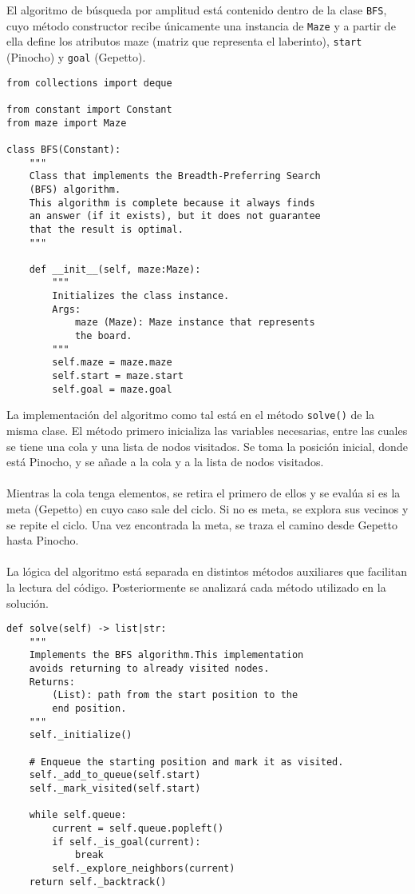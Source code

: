 El algoritmo de búsqueda por amplitud está contenido dentro de la clase \lstinline{BFS}, cuyo método constructor recibe únicamente una instancia de \lstinline{Maze} y a partir de ella define los atributos maze (matriz que representa el laberinto), \lstinline{start} (Pinocho) y \lstinline{goal} (Gepetto).\\
\begin{lstlisting}
from collections import deque

from constant import Constant
from maze import Maze

class BFS(Constant):
    """
    Class that implements the Breadth-Preferring Search
    (BFS) algorithm.
    This algorithm is complete because it always finds
    an answer (if it exists), but it does not guarantee
    that the result is optimal.
    """

    def __init__(self, maze:Maze):
        """
        Initializes the class instance.
        Args:
            maze (Maze): Maze instance that represents
            the board.
        """
        self.maze = maze.maze
        self.start = maze.start
        self.goal = maze.goal
\end{lstlisting}
\clearpage
La implementación del algoritmo como tal está en el método \lstinline{solve()} de la misma clase. El método primero inicializa las variables necesarias, entre las cuales se tiene una cola y una lista de nodos visitados. Se toma la posición inicial, donde está Pinocho, y se añade a la cola y a la lista de nodos visitados.\\\\
Mientras la cola tenga elementos, se retira el primero de ellos y se evalúa si es la meta (Gepetto) en cuyo caso sale del ciclo. Si no es meta, se explora sus vecinos y se repite el ciclo. Una vez encontrada la meta, se traza el camino desde Gepetto hasta Pinocho.\\\\
La lógica del algoritmo está separada en distintos métodos auxiliares que facilitan la lectura del código. Posteriormente se analizará cada método utilizado en la solución.\\
\begin{lstlisting}
def solve(self) -> list|str:
    """
    Implements the BFS algorithm.This implementation
    avoids returning to already visited nodes.
    Returns:
        (List): path from the start position to the
        end position.
    """
    self._initialize()

    # Enqueue the starting position and mark it as visited.
    self._add_to_queue(self.start)
    self._mark_visited(self.start)

    while self.queue:
        current = self.queue.popleft()
        if self._is_goal(current):
            break
        self._explore_neighbors(current)
    return self._backtrack()
\end{lstlisting}
